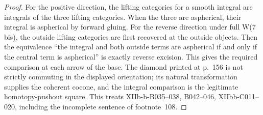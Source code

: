 \begin{proof}
For the positive direction, the lifting categories for a smooth integral are integrals of the three lifting categories. When the three are aspherical, their integral is aspherical by forward gluing. For the reverse direction under full W(7 bis), the outside lifting categories are first recovered at the outside objects. Then the equivalence ``the integral and both outside terms are aspherical if and only if the central term is aspherical'' is exactly reverse excision. This gives the required comparison at each arrow of the base. The diamond printed at p.~156 is not strictly commuting in the displayed orientation; its natural transformation supplies the coherent cocone, and the integral comparison is the legitimate homotopy-pushout square. This treats XIIb-b-B035--038, B042--046, XIIbb-C011--020, including the incomplete sentence of footnote~108.
\end{proof}

